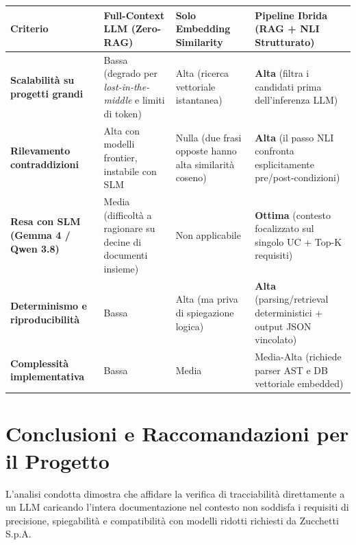 \documentclass[a4paper, 11pt]{article}
\begin{document}
\vspace{0.3cm}
\noindent
\begin{tabularx}{\textwidth}{|X|X|X|X|}
    \hline
    \textbf{Criterio} & \textbf{Full-Context LLM (Zero-RAG)} & \textbf{Solo Embedding Similarity} & \textbf{Pipeline Ibrida (RAG + NLI Strutturato)} \\ \hline
    \textbf{Scalabilità su progetti grandi} & Bassa (degrado per \textit{lost-in-the-middle} e limiti di token) & Alta (ricerca vettoriale istantanea) & \textbf{Alta} (filtra i candidati prima dell'inferenza LLM) \\ \hline
    \textbf{Rilevamento contraddizioni} & Alta con modelli frontier, instabile con SLM & Nulla (due frasi opposte hanno alta similarità coseno) & \textbf{Alta} (il passo NLI confronta esplicitamente pre/post-condizioni) \\ \hline
    \textbf{Resa con SLM (Gemma 4 / Qwen 3.8)} & Media (difficoltà a ragionare su decine di documenti insieme) & Non applicabile & \textbf{Ottima} (contesto focalizzato sul singolo UC + Top-K requisiti) \\ \hline
    \textbf{Determinismo e riproducibilità} & Bassa & Alta (ma priva di spiegazione logica) & \textbf{Alta} (parsing/retrieval deterministici + output JSON vincolato) \\ \hline
    \textbf{Complessità implementativa} & Bassa & Media & Media-Alta (richiede parser AST e DB vettoriale embedded) \\ \hline
\end{tabularx}
\vspace{0.3cm}

\section{Conclusioni e Raccomandazioni per il Progetto}

L'analisi condotta dimostra che affidare la verifica di tracciabilità direttamente a un LLM caricando l'intera documentazione nel contesto non soddisfa i requisiti di precisione, spiegabilità e compatibilità con modelli ridotti richiesti da Zucchetti S.p.A.
\end{document}
